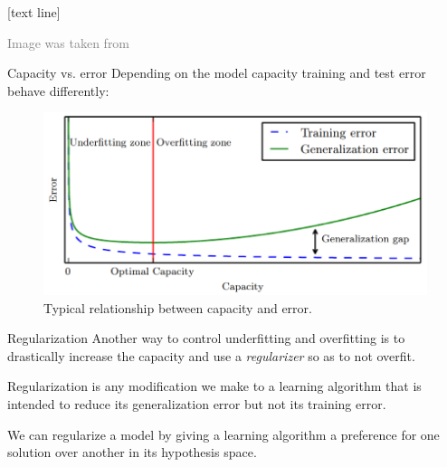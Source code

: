 \documentclass[dvipsnames]{beamer}
\newcommand{\referencefootnote}[1]{\setbeamertemplate{footline}[text line]{%
\parbox{0.9\paperwidth}{\vspace*{-23pt}\tiny{\textcolor{gray}{#1}}\hfill\scriptsize\insertframenumber}}}
\begin{document}
{ \referencefootnote{Image was taken from \cite{Goodfellow_et_al_2016}}
\begin{frame}{Capacity vs. error}
Depending on the model capacity training and test error behave differently:
 \begin{figure}
		\center
		\includegraphics[scale=.4]{figures/capacity.png} 
		\caption{Typical relationship between capacity and error.}
	\end{figure}
\end{frame}
}
\begin{frame}{Regularization}
	Another way to control underfitting and overfitting is to drastically increase the capacity and use a \emph{regularizer} so as to not overfit. \pause
	
	Regularization is any modiﬁcation we make to a learning algorithm that is intended to reduce its generalization error but not its
training error. \pause
	
	We can regularize a model by giving a learning algorithm a preference for one solution over another in its hypothesis space.
\end{frame}
\end{document}
